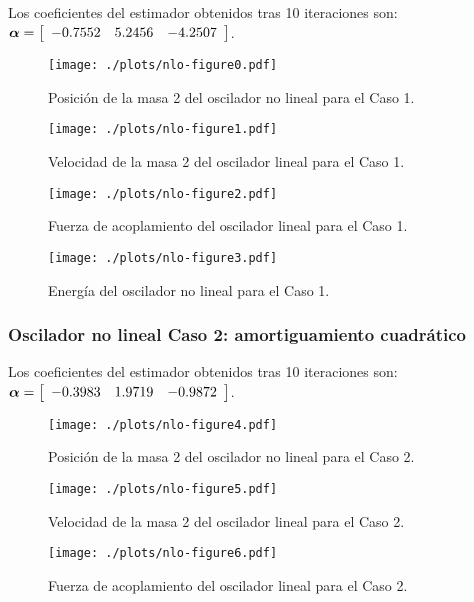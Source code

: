 Los coeficientes del estimador obtenidos tras 10 iteraciones son:
$\coefficients = \sqbr{\matr{ccc}{-0.7552 & 5.2456 & -4.2507}}$.

\begin{figure}[ht!]\centering
	\texttt{[image: ./plots/nlo-figure0.pdf]}
	\caption{Posición de la masa 2 del oscilador no lineal para el Caso 1.}
	\label{fig:OsciladorNoLinealPos1}
\end{figure}

\begin{figure}[ht!]\centering
	\texttt{[image: ./plots/nlo-figure1.pdf]}
	\caption{Velocidad de la masa 2 del oscilador lineal para el Caso 1.}
	\label{fig:OsciladorNoLinealVel1}
\end{figure}

\begin{figure}[ht!]\centering
	\texttt{[image: ./plots/nlo-figure2.pdf]}
	\caption{Fuerza de acoplamiento del oscilador lineal para el Caso 1.}
	\label{fig:OsciladorNoLinealFor1}
\end{figure}

\begin{figure}[ht!]\centering
	\texttt{[image: ./plots/nlo-figure3.pdf]}
	\caption{Energía del oscilador no lineal para el Caso 1.}
	\label{fig:OsciladorNoLinealEnergia1}
\end{figure}

\subsubsection{Oscilador no lineal Caso 2: amortiguamiento cuadrático}
\label{subsec:res_osciladorNL2}

Los coeficientes del estimador obtenidos tras 10 iteraciones son:
$\coefficients = \sqbr{\matr{ccc}{-0.3983 & 1.9719 &-0.9872}}$.

\begin{figure}[ht!]\centering
	\texttt{[image: ./plots/nlo-figure4.pdf]}
	\caption{Posición de la masa 2 del oscilador no lineal para el Caso 2.}
	\label{fig:OsciladorNoLinealPos2}
\end{figure}

\begin{figure}[ht!]\centering
	\texttt{[image: ./plots/nlo-figure5.pdf]}
	\caption{Velocidad de la masa 2 del oscilador lineal para el Caso 2.}
	\label{fig:OsciladorNoLinealVel2}
\end{figure}

\begin{figure}[ht!]\centering
	\texttt{[image: ./plots/nlo-figure6.pdf]}
	\caption{Fuerza de acoplamiento del oscilador lineal para el Caso 2.}
	\label{fig:OsciladorNoLinealFor2}
\end{figure}


